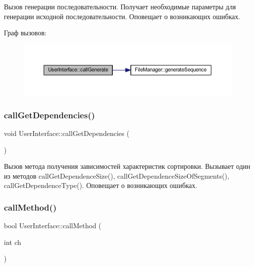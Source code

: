 Вызов генерации последовательности. Получает необходимые параметры для генерации исходной последовательности. Оповещает о возникающих ошибках. 

Граф вызовов\+:\nopagebreak
\begin{figure}[H]
\begin{center}
\leavevmode
\includegraphics[width=350pt]{class_user_interface_a27c547dadfd5588d5b734e253b2e8a4a_cgraph}
\end{center}
\end{figure}
\hypertarget{class_user_interface_a332db63dca89d684f7e9e1272f4c3745}{}\label{class_user_interface_a332db63dca89d684f7e9e1272f4c3745} 
\subsubsection{\texorpdfstring{call\+Get\+Dependencies()}{callGetDependencies()}}
{\footnotesize\ttfamily void User\+Interface\+::call\+Get\+Dependencies (\begin{DoxyParamCaption}{ }\end{DoxyParamCaption})\hspace{0.3cm}{\ttfamily [private]}}



Вызов метода получения зависимостей характеристик сортировки. Вызывает один из методов call\+Get\+Dependence\+Size(), call\+Get\+Dependence\+Size\+Of\+Segments(), call\+Get\+Dependence\+Type(). Оповещает о возникающих ошибках. 

\hypertarget{class_user_interface_ad388ff348c0a124038f4ea9756b80041}{}\label{class_user_interface_ad388ff348c0a124038f4ea9756b80041} 
\subsubsection{\texorpdfstring{call\+Method()}{callMethod()}}
{\footnotesize\ttfamily bool User\+Interface\+::call\+Method (\begin{DoxyParamCaption}\item[{int}]{ch }\end{DoxyParamCaption})\hspace{0.3cm}{\ttfamily [private]}}



